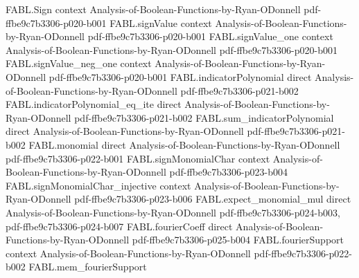 \begin{theorem}
\label{FABL.noiseSensitivity_le_inverseNoiseFloor_totalInfluenceBound}
\leanok
{}
\proofstep
  {FABL.Sign}
  {context}
  {Analysis-of-Boolean-Functions-by-Ryan-ODonnell}
  {pdf-ffbe9c7b3306-p020-b001}
\proofstep
  {FABL.signValue}
  {context}
  {Analysis-of-Boolean-Functions-by-Ryan-ODonnell}
  {pdf-ffbe9c7b3306-p020-b001}
\proofstep
  {FABL.signValue_one}
  {context}
  {Analysis-of-Boolean-Functions-by-Ryan-ODonnell}
  {pdf-ffbe9c7b3306-p020-b001}
\proofstep
  {FABL.signValue_neg_one}
  {context}
  {Analysis-of-Boolean-Functions-by-Ryan-ODonnell}
  {pdf-ffbe9c7b3306-p020-b001}
\proofstep
  {FABL.indicatorPolynomial}
  {direct}
  {Analysis-of-Boolean-Functions-by-Ryan-ODonnell}
  {pdf-ffbe9c7b3306-p021-b002}
\proofstep
  {FABL.indicatorPolynomial_eq_ite}
  {direct}
  {Analysis-of-Boolean-Functions-by-Ryan-ODonnell}
  {pdf-ffbe9c7b3306-p021-b002}
\proofstep
  {FABL.sum_indicatorPolynomial}
  {direct}
  {Analysis-of-Boolean-Functions-by-Ryan-ODonnell}
  {pdf-ffbe9c7b3306-p021-b002}
\proofstep
  {FABL.monomial}
  {direct}
  {Analysis-of-Boolean-Functions-by-Ryan-ODonnell}
  {pdf-ffbe9c7b3306-p022-b001}
\proofstep
  {FABL.signMonomialChar}
  {context}
  {Analysis-of-Boolean-Functions-by-Ryan-ODonnell}
  {pdf-ffbe9c7b3306-p023-b004}
\proofstep
  {FABL.signMonomialChar_injective}
  {context}
  {Analysis-of-Boolean-Functions-by-Ryan-ODonnell}
  {pdf-ffbe9c7b3306-p023-b006}
\proofstep
  {FABL.expect_monomial_mul}
  {direct}
  {Analysis-of-Boolean-Functions-by-Ryan-ODonnell}
  {pdf-ffbe9c7b3306-p024-b003,
    pdf-ffbe9c7b3306-p024-b007}
\proofstep
  {FABL.fourierCoeff}
  {direct}
  {Analysis-of-Boolean-Functions-by-Ryan-ODonnell}
  {pdf-ffbe9c7b3306-p025-b004}
\proofstep
  {FABL.fourierSupport}
  {context}
  {Analysis-of-Boolean-Functions-by-Ryan-ODonnell}
  {pdf-ffbe9c7b3306-p022-b002}
\proofstep
  {FABL.mem_fourierSupport}

\end{theorem}
